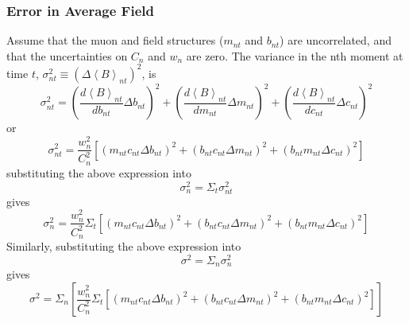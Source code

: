 \documentclass[twoside]{article}
\begin{document}
\subsubsection{Error in Average Field}
Assume that the muon and field structures ($m_{nt}$ and $b_{nt}$) are uncorrelated, and that the uncertainties on $C_n$ and $w_n$ are zero. The variance in the nth moment at time $t$, $\sigma^2_{nt} \equiv (\Delta \left\langle B \right\rangle_{nt})^2$, is 
\begin{equation}
\sigma^2_{nt} =
(\frac{d \left\langle B \right\rangle_{nt}}{db_{nt}}\Delta b_{nt})^2 +
(\frac{d \left\langle B \right\rangle_{nt}}{dm_{nt}}\Delta m_{nt})^2 + 
(\frac{d \left\langle B \right\rangle_{nt}}{dc_{nt}}\Delta c_{nt})^2 
\end{equation}
or 
\begin{equation}
\boxed{
\sigma^2_{nt} =
\frac{w^2_n}{C^2_n}[(m_{nt} c_{nt} \Delta b_{nt})^2 + (b_{nt} c_{nt} \Delta m_{nt})^2  + (b_{nt} m_{nt} \Delta c_{nt})^2 ]
}
\end{equation}
substituting the above expression into
\begin{equation}
\sigma^2_{n} = \Sigma_t  \sigma^2_{nt} 
\end{equation}
gives 
\begin{equation}
\boxed{
\sigma^2_{n} = \frac{w^2_n}{C^2_n} \Sigma_t  [(m_{nt} c_{nt} \Delta b_{nt})^2 + (b_{nt} c_{nt} \Delta m_{nt})^2  + (b_{nt} m_{nt} \Delta c_{nt})^2 ]
}
\end{equation}
Similarly, substituting the above expression into
\begin{equation}
\sigma^2 = \Sigma_n  \sigma^2_{n} 
\end{equation}
gives
\begin{equation}
\boxed{
	\sigma^2 = \Sigma_n [\frac{w^2_n}{C^2_n} \Sigma_t  [(m_{nt} c_{nt} \Delta b_{nt})^2 + (b_{nt} c_{nt} \Delta m_{nt})^2  + (b_{nt} m_{nt} \Delta c_{nt})^2 ]]
}
\end{equation}
\end{document}
